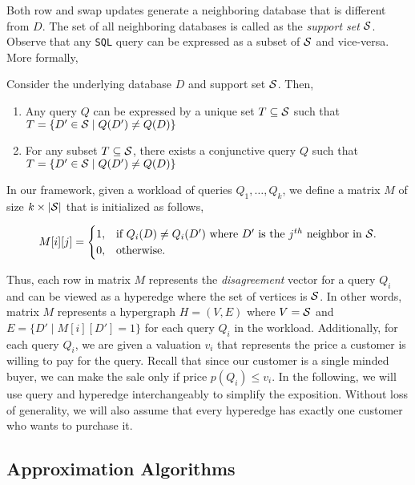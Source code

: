 Both row and swap updates generate a neighboring database that is different from $D$. The set of all neighboring databases is called as the \emph{support set} $\mathcal{S}$. Observe that any \texttt{SQL} query can be expressed as a subset of $\mathcal{S}$ and vice-versa. More formally,

\begin{proposition}
	Consider the underlying database $D$ and support set $\mathcal{S}$. Then,
	\begin{enumerate}
		\item Any query $Q$ can be expressed by a unique set $T \subseteq \mathcal{S}$ such that $T = \{ D' \in \mathcal{S} \mid Q(D') \neq Q(D)\}$
		\item For any subset $T \subseteq \mathcal{S}$, there exists a conjunctive query $Q$ such that $T = \{ D' \in \mathcal{S} \mid Q(D') \neq Q(D)\}$
	\end{enumerate} 
\end{proposition}	

In our framework, given a workload of queries $Q_1, \dots, Q_k$, we define a matrix $M$ of size $k \times |\mathcal{S}|$ that is initialized as follows, 

\begin{equation}
M[i][j]=\begin{cases}
1, & \text{if $Q_i(D) \neq Q_i(D')$ where $D'$ is the $j^{th}$ neighbor in $\mathcal{S}$}.\\
0, & \text{otherwise}.
\end{cases}
\end{equation}

Thus, each row in matrix $M$ represents the \emph{disagreement} vector for a query $Q_i$ and can be viewed as a hyperedge where the set of vertices is $\mathcal{S}$. In other words, matrix $M$ represents a hypergraph $H = (V, E)$ where $V = \mathcal{S}$ and $E = \{ D' \mid M[i][D'] = 1\}$ for each query $Q_i$ in the workload. Additionally, for each query $Q_i$, we are given a valuation $v_i$ that represents the price a customer is willing to pay for the query. Recall that since our customer is a single minded buyer, we can make the sale only if price $p(Q_i) \leq v_i$. In the following, we will use query and hyperedge interchangeably to simplify the exposition. Without loss of generality, we will also assume that every hyperedge has exactly one customer who wants to purchase it. 

\subsection{Approximation Algorithms}

